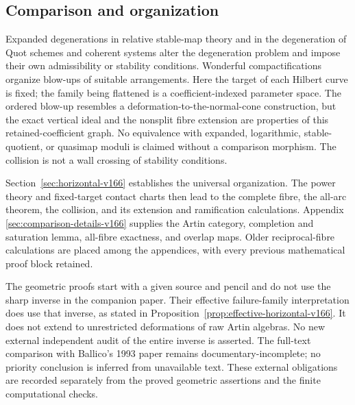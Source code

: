 \documentclass[11pt,reqno]{amsart}
\numberwithin{equation}{section}
\theoremstyle{definition}\newtheorem{definition}[theorem]{Definition}
\theoremstyle{remark}\newtheorem{remark}[theorem]{Remark}
\begin{document}
\subsection{Comparison and organization}
Expanded degenerations in relative stable-map theory
\cite{JunLi166} and in the degeneration of Quot schemes and
coherent systems \cite{LiWu166} alter the degeneration problem and
impose their own admissibility or stability conditions. Wonderful
compactifications \cite{Li2009v161} organize blow-ups of suitable
arrangements. Here the target of each Hilbert curve is fixed; the
family being flattened is a coefficient-indexed parameter space.
The ordered blow-up resembles a deformation-to-the-normal-cone
construction, but the exact vertical ideal and the nonsplit fibre
extension are properties of this retained-coefficient graph.
No equivalence with expanded, logarithmic, stable-quotient, or
quasimap moduli is claimed without a comparison morphism. The
collision is not a wall crossing of stability conditions.

Section~\ref{sec:horizontal-v166} establishes the universal
organization. The power theory and fixed-target contact charts
then lead to the complete fibre, the all-arc theorem, the collision,
and its extension and ramification calculations. Appendix
\ref{sec:comparison-details-v166} supplies the Artin category,
completion and saturation lemma, all-fibre exactness, and overlap
maps. Older reciprocal-fibre calculations are placed among the
appendices, with every previous mathematical proof block retained.

The geometric proofs start with a given source and pencil and do
not use the sharp inverse in the companion paper. Their effective
failure-family interpretation does use that inverse, as stated in
Proposition~\ref{prop:effective-horizontal-v166}. It does not extend
to unrestricted deformations of raw Artin algebras. No new external
independent audit of the entire inverse is asserted. The full-text
comparison with Ballico's 1993 paper remains documentary-incomplete;
no priority conclusion is inferred from unavailable text. These
external obligations are recorded separately from the proved
geometric assertions and the finite computational checks.
\end{document}
